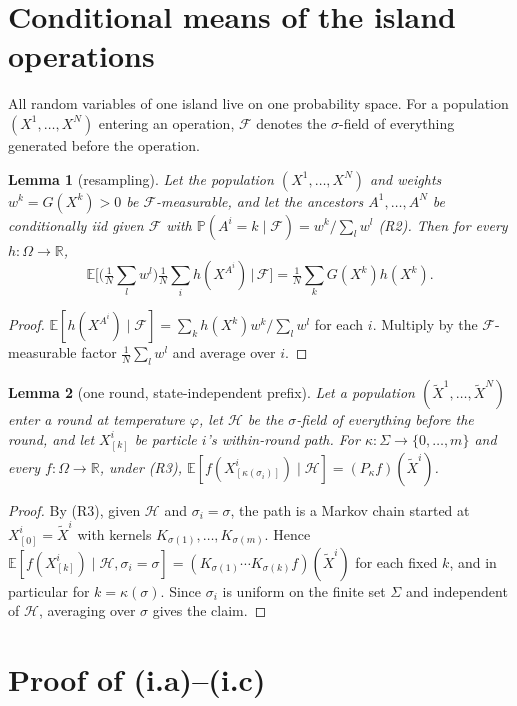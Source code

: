 \documentclass[11pt]{article}
\newtheorem{lemma}{Lemma}[section]
\theoremstyle{remark}
\newcommand{\E}{\mathbb{E}}
\renewcommand{\P}{\mathbb{P}}
\newcommand{\R}{\mathbb{R}}
\newcommand{\cF}{\mathcal{F}}
\newcommand{\cH}{\mathcal{H}}
\newcommand{\Om}{\Omega}
\begin{document}
\section{Conditional means of the island operations}

All random variables of one island live on one probability space. For a population $(X^1,\dots,X^N)$ entering an operation, $\cF$ denotes the $\sigma$-field of everything generated before the operation.

\begin{lemma}[resampling]\label{lem:res}
Let the population $(X^1,\dots,X^N)$ and weights $w^k=G(X^k)>0$ be $\cF$-measurable, and let the ancestors $A^1,\dots,A^N$ be conditionally iid given $\cF$ with $\P(A^i=k\mid\cF)=w^k/\sum_lw^l$ (R2). Then for every $h:\Om\to\R$,
\[ \E\Big[\Big(\tfrac1N\textstyle\sum_lw^l\Big)\tfrac1N\textstyle\sum_i h(X^{A^i})\,\Big|\,\cF\Big]=\tfrac1N\textstyle\sum_k G(X^k)h(X^k). \]
\end{lemma}
\begin{proof}
$\E[h(X^{A^i})\mid\cF]=\sum_kh(X^k)w^k/\sum_lw^l$ for each $i$. Multiply by the $\cF$-measurable factor $\frac1N\sum_lw^l$ and average over $i$.
\end{proof}

\begin{lemma}[one round, state-independent prefix]\label{lem:round}
Let a population $(\tilde X^1,\dots,\tilde X^N)$ enter a round at temperature $\varphi$, let $\cH$ be the $\sigma$-field of everything before the round, and let $X^i_{[k]}$ be particle $i$'s within-round path. For $\kappa:\Sigma\to\{0,\dots,m\}$ and every $f:\Om\to\R$, under (R3), $\E[f(X^i_{[\kappa(\sigma_i)]})\mid\cH]=(P_\kappa f)(\tilde X^i)$.
\end{lemma}
\begin{proof}
By (R3), given $\cH$ and $\sigma_i=\sigma$, the path is a Markov chain started at $X^i_{[0]}=\tilde X^i$ with kernels $K_{\sigma(1)},\dots,K_{\sigma(m)}$. Hence $\E[f(X^i_{[k]})\mid\cH,\sigma_i=\sigma]=(K_{\sigma(1)}\cdots K_{\sigma(k)}f)(\tilde X^i)$ for each fixed $k$, and in particular for $k=\kappa(\sigma)$. Since $\sigma_i$ is uniform on the finite set $\Sigma$ and independent of $\cH$, averaging over $\sigma$ gives the claim.
\end{proof}

\section{Proof of (i.a)--(i.c)}
\end{document}
